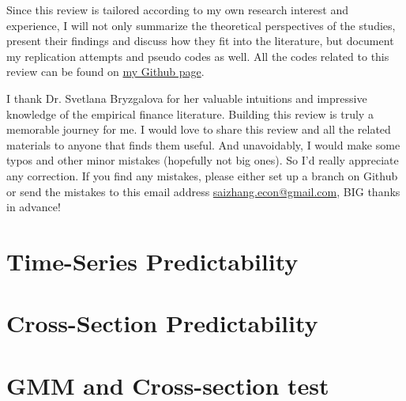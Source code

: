 \documentclass[12pt,openany]{report}
\begin{document}
Since this review is tailored according to my own research interest and
experience, I will not only summarize the theoretical perspectives of the
studies, present their findings and discuss how they fit into the literature,
but document my replication attempts and pseudo codes as well. All the codes related
to this review can be found on \href{https://github.com/SaiChrisZHANG}{my Github page}.

I thank Dr. Svetlana Bryzgalova for her valuable intuitions and impressive
knowledge of the empirical finance literature. Building this review is truly
a memorable journey for me. I would love to share this review and all the related
materials to anyone that finds them useful. And unavoidably, I would make some
typos and other minor mistakes (hopefully not big ones). So I'd really appreciate
any correction. If you find any mistakes, please either set up a branch on Github
or send the mistakes to this email address 
\href{mailto:saizhang.econ@gmail.com}{saizhang.econ@gmail.com}, BIG thanks in advance!

\newpage

\dominitoc
{}%
\label{ToC-first-page}
\tableofcontents


\pagestyle{mystyle}
\chapter{Time-Series Predictability}


\chapter{Cross-Section Predictability}


\chapter{GMM and Cross-section test}


\newpage


\end{document}
